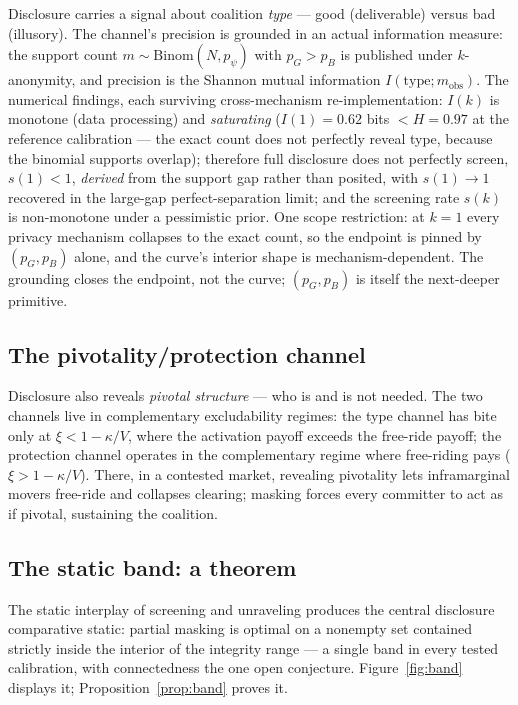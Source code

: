 \documentclass[11pt]{article}
\theoremstyle{definition}
\theoremstyle{remark}
\begin{document}
Disclosure carries a signal about coalition \emph{type} --- good (deliverable) versus bad
(illusory). The channel's precision is grounded in an actual information measure: the
support count $m \sim \mathrm{Binom}(N, p_\psi)$ with $p_G > p_B$ is published under
$k$-anonymity, and precision is the Shannon mutual information $I(\text{type};
m_{\mathrm{obs}})$. The numerical findings, each surviving cross-mechanism
re-implementation: $I(k)$ is monotone (data processing) and \emph{saturating}
($I(1)=0.62$ bits $< H=0.97$ at the reference calibration --- the exact count does not
perfectly reveal type, because the binomial supports overlap); therefore full disclosure
does not perfectly screen, $s(1)<1$, \emph{derived} from the support gap rather than
posited, with $s(1)\to1$ recovered in the large-gap perfect-separation limit; and the
screening rate $s(k)$ is non-monotone under a pessimistic prior. One scope restriction: at
$k=1$ every privacy mechanism collapses to the exact count, so the endpoint is pinned by
$(p_G,p_B)$ alone, and the curve's interior shape is mechanism-dependent. The grounding
closes the endpoint, not the curve; $(p_G,p_B)$ is itself the next-deeper primitive.

\subsection{The pivotality/protection channel}

Disclosure also reveals \emph{pivotal structure} --- who is and is not needed. The two
channels live in complementary excludability regimes: the type channel has bite only at
$\xi < 1-\kappa/V$, where the activation payoff exceeds the free-ride payoff; the
protection channel operates in the complementary regime where free-riding pays
($\xi > 1-\kappa/V$). There, in a contested market, revealing pivotality lets
inframarginal movers free-ride and collapses clearing; masking forces every committer to
act as if pivotal, sustaining the coalition.

\subsection{The static band: a theorem}

The static interplay of screening and unraveling produces the central disclosure
comparative static: partial masking is optimal on a nonempty set contained strictly inside
the interior of the integrity range --- a single band in every tested calibration, with
connectedness the one open conjecture. Figure~\ref{fig:band} displays it; Proposition~\ref{prop:band} proves it.
\end{document}
